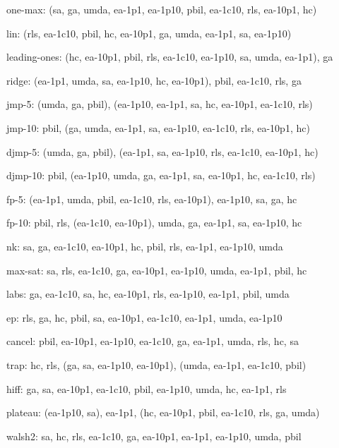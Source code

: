 one-max: (sa, ga, umda, ea-1p1, ea-1p10, pbil, ea-1c10, rls, ea-10p1, hc)

lin: (rls, ea-1c10, pbil, hc, ea-10p1, ga, umda, ea-1p1, sa, ea-1p10)

leading-ones: (hc, ea-10p1, pbil, rls, ea-1c10, ea-1p10, sa, umda, ea-1p1), ga

ridge: (ea-1p1, umda, sa, ea-1p10, hc, ea-10p1), pbil, ea-1c10, rls, ga

jmp-5: (umda, ga, pbil), (ea-1p10, ea-1p1, sa, hc, ea-10p1, ea-1c10, rls)

jmp-10: pbil, (ga, umda, ea-1p1, sa, ea-1p10, ea-1c10, rls, ea-10p1, hc)

djmp-5: (umda, ga, pbil), (ea-1p1, sa, ea-1p10, rls, ea-1c10, ea-10p1, hc)

djmp-10: pbil, (ea-1p10, umda, ga, ea-1p1, sa, ea-10p1, hc, ea-1c10, rls)

fp-5: (ea-1p1, umda, pbil, ea-1c10, rls, ea-10p1), ea-1p10, sa, ga, hc

fp-10: pbil, rls, (ea-1c10, ea-10p1), umda, ga, ea-1p1, sa, ea-1p10, hc

nk: sa, ga, ea-1c10, ea-10p1, hc, pbil, rls, ea-1p1, ea-1p10, umda

max-sat: sa, rls, ea-1c10, ga, ea-10p1, ea-1p10, umda, ea-1p1, pbil, hc

labs: ga, ea-1c10, sa, hc, ea-10p1, rls, ea-1p10, ea-1p1, pbil, umda

ep: rls, ga, hc, pbil, sa, ea-10p1, ea-1c10, ea-1p1, umda, ea-1p10

cancel: pbil, ea-10p1, ea-1p10, ea-1c10, ga, ea-1p1, umda, rls, hc, sa

trap: hc, rls, (ga, sa, ea-1p10, ea-10p1), (umda, ea-1p1, ea-1c10, pbil)

hiff: ga, sa, ea-10p1, ea-1c10, pbil, ea-1p10, umda, hc, ea-1p1, rls

plateau: (ea-1p10, sa), ea-1p1, (hc, ea-10p1, pbil, ea-1c10, rls, ga, umda)

walsh2: sa, hc, rls, ea-1c10, ga, ea-10p1, ea-1p1, ea-1p10, umda, pbil

